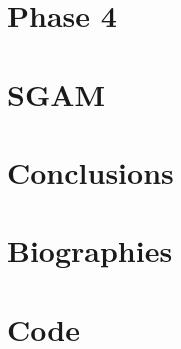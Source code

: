 \documentclass[10pt, a4paper]{report}
\begin{document}
\chapter{Phase 4}


\chapter{SGAM}


\chapter{Conclusions}


\chapter{Biographies}


\chapter{Code}


\printbibliography[heading=bibintoc]
\end{document}
